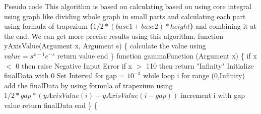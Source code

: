 \documentclass[final]{beamer}
\newlength{\onecolwid}
\newlength{\twocolwid}
\begin{document}
\begin{frame}
\begin{columns}[t]
\begin{column}{\twocolwid}
\begin{columns}[t,totalwidth=\twocolwid]
\begin{column}{\onecolwid}
\begin{exampleblock}{Pseudo code}
\small{This algorithm is based on calculating based on using core integral using graph like dividing whole graph in small parts and calculating each part using formula of trapezium \textbf{($ 1/2*(base1 + base2)*height $)} and combining it at the end. We can get more precise results using this algorithm.  \newline\newline
function yAxisValue(Argument x, Argument s) \{ \newline 
\hspace*{20pt}calculate the value using $value = {s^{x - 1} e^{ - s}}$\newline
\hspace*{20pt}return value\newline
end \newline
\}  \newline
function gammaFunction (Argument x) \{ \newline
\hspace*{20pt} if x $<$ 0\newline
\hspace*{50pt} then raise Negative Input Error\newline
\hspace*{20pt} if x $>$ 110\newline
\hspace*{50pt} then return "Infinity"\newline
\hspace*{20pt} Initialize finalData with 0\newline
\hspace*{20pt} Set Interval for gap = $10 ^ {-3}$ \newline
\hspace*{20pt} while loop i for range (0,Infinity)\newline
\hspace*{50pt} add the finalData by using formula of trapezium using \newline 
\hspace*{50pt} \textbf{$1/2*gap*(yAxisValue(i) + yAxisValue(i-gap))$} \newline
\hspace*{50pt} increment i with gap value \newline
\hspace*{20pt} return finalData\newline
end \newline
\} \{ \newline
}
\end{exampleblock}
\end{column}
\end{columns}
\end{column}
\end{columns}
\end{frame}
\end{document}
